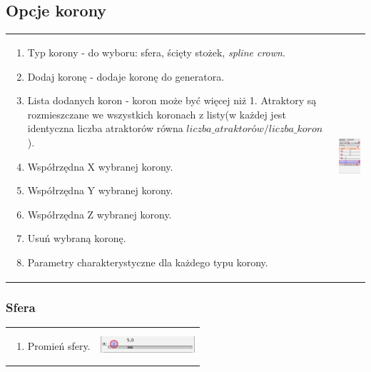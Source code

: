 \subsection{Opcje korony}
\begin{threeparttable}
\begin{tabular}{lr}
\parbox[c]{95mm}{
\begin{enumerate}
	\item {Typ korony - do wyboru: sfera, ścięty stożek, \textit{spline crown}.}
	\item {Dodaj koronę - dodaje koronę do generatora.}	
	\item {Lista dodanych koron - koron może być więcej niż 1. Atraktory są rozmieszczane we wszystkich koronach z listy(w każdej jest identyczna liczba atraktorów równa $liczba\_atraktorów/liczba\_koron$).}
	\item {Współrzędna X wybranej korony.}
	\item {Współrzędna Y wybranej korony.}
	\item {Współrzędna Z wybranej korony.}
	\item {Usuń wybraną koronę.}
	\item {Parametry charakterystyczne dla każdego typu korony.}
\end{enumerate}
} &
\parbox[c]{35mm}{
\includegraphics[width=35mm]{images/gui/crown_panel.png}
}\\
\end{tabular}
\end{threeparttable}

\subsubsection{Sfera}
\begin{threeparttable}
\begin{tabular}{lr}
\parbox[c]{95mm}{
\begin{enumerate}
	\item {Promień sfery.}
\end{enumerate}
} &
\parbox[c]{35mm}{
\includegraphics[width=35mm]{images/gui/sphere_crown.png}
}\\
\end{tabular}
\end{threeparttable}


